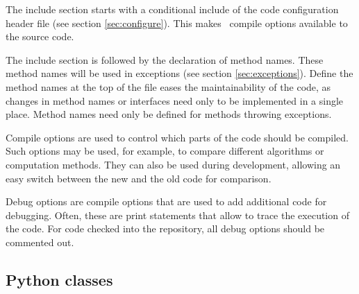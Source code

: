 \documentclass{article}[12pt,a4]
\begin{document}
The include section starts with a conditional include of the code configuration header file
(see section \ref{sec:configure}).
This makes \this\ compile options available to the source code.

The include section is followed by the declaration of method names.
These method names will be used in exceptions (see section \ref{sec:exceptions}).
Define the method names at the top of the file eases the maintainability of the code,
as changes in method names or interfaces need only to be implemented in a single 
place.
Method names need only be defined for methods throwing exceptions.

Compile options are used to control which parts of the code should be compiled.
Such options may be used, for example, to compare different algorithms or computation
methods.
They can also be used during development, allowing an easy switch between the new and
the old code for comparison.

Debug options are compile options that are used to add additional code for debugging.
Often, these are print statements that allow to trace the execution of the code.
For code checked into the repository, all debug options should be commented out.


\subsection{Python classes}
\label{sec:pyhton}
\end{document}
